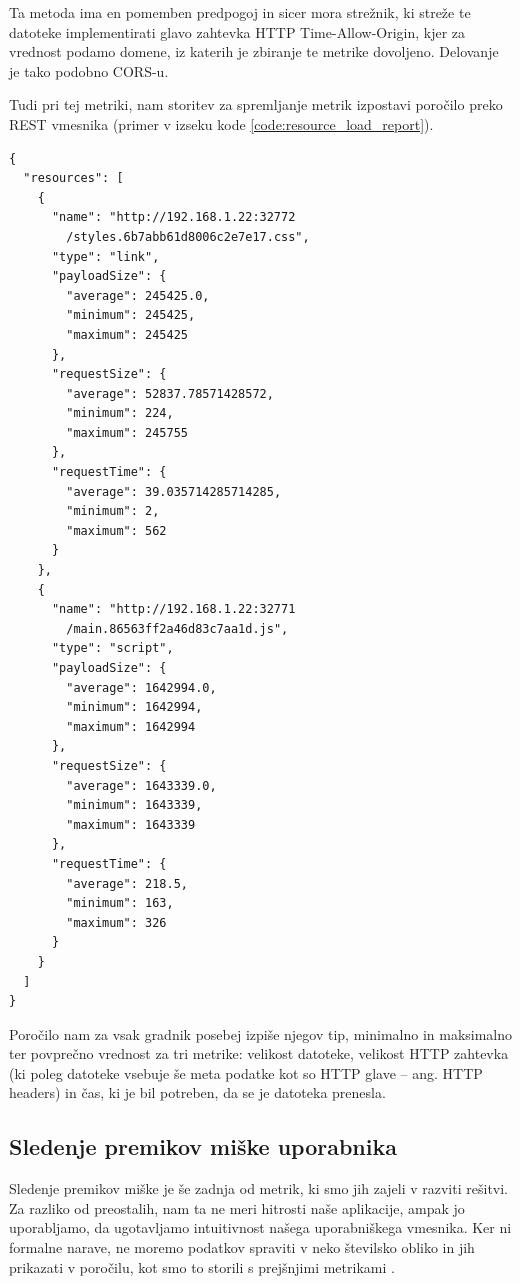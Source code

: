 \documentclass[a4paper, 12pt]{book}
\begin{document}
Ta metoda ima en pomemben predpogoj in sicer mora strežnik, ki streže te datoteke implementirati glavo zahtevka HTTP Time-Allow-Origin, kjer za vrednost podamo domene, iz katerih je zbiranje te metrike dovoljeno. Delovanje je tako podobno CORS-u.

Tudi pri tej metriki, nam storitev za spremljanje metrik izpostavi poročilo preko REST vmesnika (primer v izseku kode \ref{code:resource_load_report}).

\begin{lstlisting}[label=code:resource_load_report, caption=Poročilo časa nalaganja gradnikov strani]
{
  "resources": [
    {
      "name": "http://192.168.1.22:32772
        /styles.6b7abb61d8006c2e7e17.css",
      "type": "link",
      "payloadSize": {
        "average": 245425.0,
        "minimum": 245425,
        "maximum": 245425
      },
      "requestSize": {
        "average": 52837.78571428572,
        "minimum": 224,
        "maximum": 245755
      },
      "requestTime": {
        "average": 39.035714285714285,
        "minimum": 2,
        "maximum": 562
      }
    },
    {
      "name": "http://192.168.1.22:32771
        /main.86563ff2a46d83c7aa1d.js",
      "type": "script",
      "payloadSize": {
        "average": 1642994.0,
        "minimum": 1642994,
        "maximum": 1642994
      },
      "requestSize": {
        "average": 1643339.0,
        "minimum": 1643339,
        "maximum": 1643339
      },
      "requestTime": {
        "average": 218.5,
        "minimum": 163,
        "maximum": 326
      }
    }
  ]
}
\end{lstlisting}

Poročilo nam za vsak gradnik posebej izpiše njegov tip, minimalno in maksimalno ter povprečno vrednost za tri metrike: velikost datoteke, velikost HTTP zahtevka (ki poleg datoteke vsebuje še meta podatke kot so HTTP glave -- ang. HTTP headers) in čas, ki je bil potreben, da se je datoteka prenesla.

\subsection{Sledenje premikov miške uporabnika}
\label{ch2:sec4}

Sledenje premikov miške je še zadnja od metrik, ki smo jih zajeli v razviti rešitvi. Za razliko od preostalih, nam ta ne meri hitrosti naše aplikacije, ampak jo uporabljamo, da ugotavljamo intuitivnost našega uporabniškega vmesnika. Ker ni formalne narave, ne moremo podatkov spraviti v neko številsko obliko in jih prikazati v poročilu, kot smo to storili s prejšnjimi metrikami \cite{ux_book}.
\end{document}
